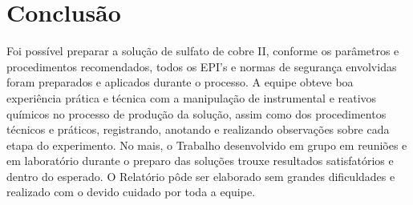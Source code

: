 \documentclass[a4paper, 11pt]{article}
\begin{document}
    \section{Conclusão}\label{sec:conclusão}
    \indent Foi possível preparar a solução de sulfato de cobre II, conforme os parâmetros e procedimentos recomendados, todos os EPI's e normas de segurança envolvidas foram preparados e aplicados durante o processo.
    \indent A equipe obteve boa experiência prática e técnica com a manipulação de instrumental e reativos químicos no processo de produção da solução, assim como dos procedimentos técnicos e práticos, registrando, anotando e realizando observações sobre cada etapa do experimento.
    \indent No mais, o Trabalho desenvolvido em grupo em reuniões e em laboratório durante o preparo das soluções trouxe resultados satisfatórios e dentro do esperado. O Relatório pôde ser elaborado sem grandes dificuldades e realizado com o devido cuidado por toda a equipe.
\end{document}
